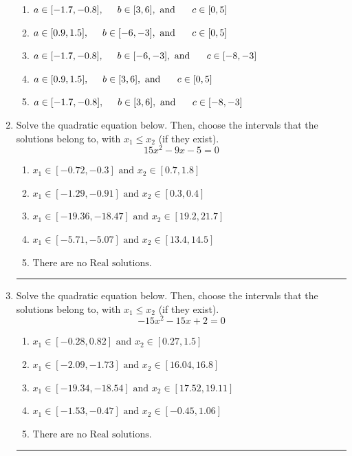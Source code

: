 \documentclass[14pt]{extbook}
\newcommand{\litem}[1]{\item#1\hspace*{-1cm}\rule{\textwidth}{0.4pt}}
\begin{document}
\begin{enumerate}
{\begin{center}
\end{center}
\begin{enumerate}[label=\Alph*.]
\item \( a \in [-1.7, -0.8], \hspace*{5mm} b \in [3, 6], \text{ and } \hspace*{5mm} c \in [0, 5] \)
\item \( a \in [0.9, 1.5], \hspace*{5mm} b \in [-6, -3], \text{ and } \hspace*{5mm} c \in [0, 5] \)
\item \( a \in [-1.7, -0.8], \hspace*{5mm} b \in [-6, -3], \text{ and } \hspace*{5mm} c \in [-8, -3] \)
\item \( a \in [0.9, 1.5], \hspace*{5mm} b \in [3, 6], \text{ and } \hspace*{5mm} c \in [0, 5] \)
\item \( a \in [-1.7, -0.8], \hspace*{5mm} b \in [3, 6], \text{ and } \hspace*{5mm} c \in [-8, -3] \)

\end{enumerate} }
\litem{
Solve the quadratic equation below. Then, choose the intervals that the solutions belong to, with $x_1 \leq x_2$ (if they exist).\[ 15x^{2} -9 x -5 = 0 \]\begin{enumerate}[label=\Alph*.]
\item \( x_1 \in [-0.72, -0.3] \text{ and } x_2 \in [0.7, 1.8] \)
\item \( x_1 \in [-1.29, -0.91] \text{ and } x_2 \in [0.3, 0.4] \)
\item \( x_1 \in [-19.36, -18.47] \text{ and } x_2 \in [19.2, 21.7] \)
\item \( x_1 \in [-5.71, -5.07] \text{ and } x_2 \in [13.4, 14.5] \)
\item \( \text{There are no Real solutions.} \)

\end{enumerate} }
\litem{
Solve the quadratic equation below. Then, choose the intervals that the solutions belong to, with $x_1 \leq x_2$ (if they exist).\[ -15x^{2} -15 x + 2 = 0 \]\begin{enumerate}[label=\Alph*.]
\item \( x_1 \in [-0.28, 0.82] \text{ and } x_2 \in [0.27, 1.5] \)
\item \( x_1 \in [-2.09, -1.73] \text{ and } x_2 \in [16.04, 16.8] \)
\item \( x_1 \in [-19.34, -18.54] \text{ and } x_2 \in [17.52, 19.11] \)
\item \( x_1 \in [-1.53, -0.47] \text{ and } x_2 \in [-0.45, 1.06] \)
\item \( \text{There are no Real solutions.} \)


\end{enumerate}}
\end{enumerate}
\end{document}
